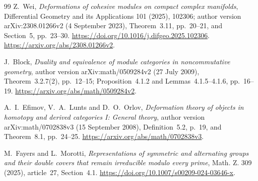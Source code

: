 \documentclass[11pt]{article}
\theoremstyle{definition}
\theoremstyle{remark}
\begin{document}
\begin{thebibliography}{99}
Z.~Wei, \emph{Deformations of cohesive modules on compact complex
manifolds}, Differential Geometry and its Applications 101 (2025),
102306; author version arXiv:2308.01266v2 (4 September 2023),
Theorem~3.11, pp.~20--21, and Section~5, pp.~23--30.
\url{https://doi.org/10.1016/j.difgeo.2025.102306}.
\url{https://arxiv.org/abs/2308.01266v2}.

J.~Block, \emph{Duality and equivalence of module categories in
noncommutative geometry}, author version arXiv:math/0509284v2
(27 July 2009), Theorem~3.2.7(2), pp.~12--15;
Proposition~4.1.2 and Lemmas~4.1.5--4.1.6, pp.~16--19.
\url{https://arxiv.org/abs/math/0509284v2}.

A.~I.~Efimov, V.~A.~Lunts and D.~O.~Orlov,
\emph{Deformation theory of objects in homotopy and derived
categories I: General theory}, author version
arXiv:math/0702838v3 (15 September 2008), Definition~5.2,
p.~19, and Theorem~8.1, pp.~24--25.
\url{https://arxiv.org/abs/math/0702838v3}.

M.~Fayers and L.~Morotti,
\emph{Representations of symmetric and alternating groups and their
double covers that remain irreducible modulo every prime},
Math. Z. 309 (2025), article~27, Section~4.1.
\url{https://doi.org/10.1007/s00209-024-03646-x}.

\end{thebibliography}
\end{document}
